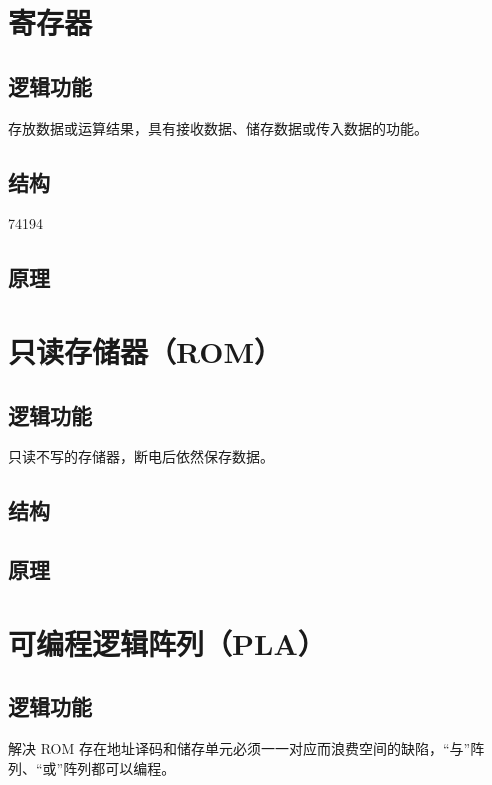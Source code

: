 \newpage
\section{寄存器}

\subsection{逻辑功能}

存放数据或运算结果，具有接收数据、储存数据或传入数据的功能。

\subsection{结构}

74194

\subsection{原理}


\newpage
\section{只读存储器（ROM）}

\subsection{逻辑功能}

只读不写的存储器，断电后依然保存数据。

\subsection{结构}

\subsection{原理}



\newpage
\section{可编程逻辑阵列（PLA）}

\subsection{逻辑功能}

解决 ROM 存在地址译码和储存单元必须一一对应而浪费空间的缺陷，“与”阵列、“或”阵列都可以编程。 

